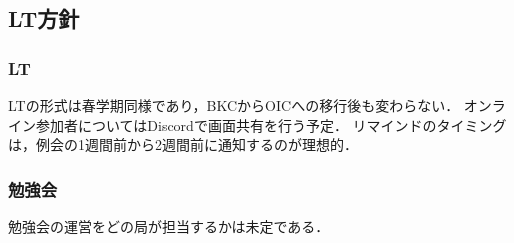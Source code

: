 \subsection*{LT方針}


\subsubsection*{LT}
LTの形式は春学期同様であり，BKCからOICへの移行後も変わらない．
オンライン参加者についてはDiscordで画面共有を行う予定．
リマインドのタイミングは，例会の1週間前から2週間前に通知するのが理想的．

\subsubsection*{勉強会}
勉強会の運営をどの局が担当するかは未定である．
